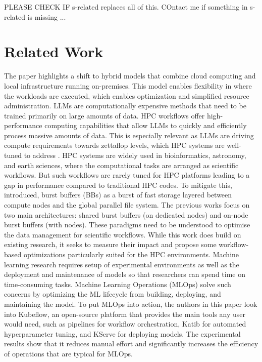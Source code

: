 PLEASE CHECK IF s-related replaces all of this. COntact me if something in s-related is missing ...

\section{Related Work}

The paper \citep{dube_future_2021} highlights a shift to hybrid models that combine cloud computing and local infrastructure running on-premises. This model enables flexibility in where the workloads are executed, which enables optimization and simplified resource administration.
LLMs are computationally expensive methods that need to be trained primarily on large amounts of data. HPC workflows offer high-performance computing capabilities that allow LLMs to quickly and efficiently process massive amounts of data.  This is especially relevant as LLMs are driving compute requirements towards zettaflop levels, which HPC systems are well-tuned to address \citep{ferreira_da_silva_workflows_2024}.
HPC systems are widely used in bioinformatics, astronomy, and earth sciences, where the computational tasks are arranged as scientific workflows.  But such workflows are rarely tuned for HPC platforms leading to a gap in performance compared to traditional HPC codes. To mitigate this, \citep{pottier_modeling_2020} introduced, burst buffers (BBs) as a burst of fast storage layered between compute nodes and the global parallel file system.  The previous works focus on two main architectures: shared burst buffers (on dedicated nodes) and on-node burst buffers (with nodes).  These paradigms need to be understood to optimise the data management for scientific workflows.  While this work does build on existing research, it seeks to measure their impact and propose some workflow-based optimizations particularly suited for the HPC environments.
Machine learning research requires setup of experimental environments as well as the deployment and maintenance of models so that researchers can spend time on time-consuming tasks. Machine Learning Operations (MLOps) solve such concerns by optimizing the ML lifecycle from building, deploying, and maintaining the model. To put MLOps into action, the authors in this paper \citep{hsu_end--end_2024} look into Kubeflow, an open-source platform that provides the main tools any user would need, such as pipelines for workflow orchestration, Katib for automated hyperparameter tuning, and KServe for deploying models. The experimental results show that it reduces manual effort and significantly increases the efficiency of operations that are typical for MLOps.




